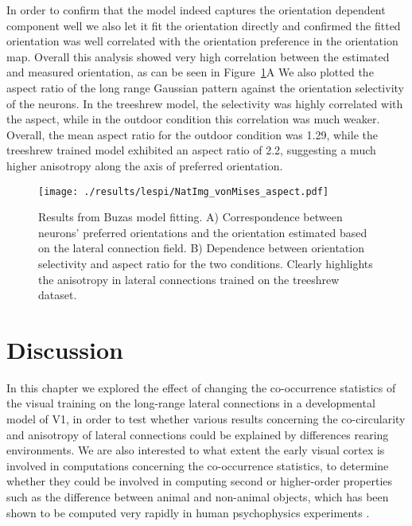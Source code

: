 In order to confirm that the model indeed captures the orientation
dependent component well we also let it fit the orientation directly
and confirmed the fitted orientation was well correlated with the
orientation preference in the orientation map. Overall this analysis
showed very high correlation between the estimated and measured
orientation, as can be seen in Figure~\ref{NatImgvonMisesAspect}A We
also plotted the aspect ratio of the long range Gaussian pattern
against the orientation selectivity of the neurons. In the treeshrew
model, the selectivity was highly correlated with the aspect, while in
the outdoor condition this correlation was much weaker. Overall, the
mean aspect ratio for the outdoor condition was 1.29, while the
treeshrew trained model exhibited an aspect ratio of 2.2, suggesting a
much higher anisotropy along the axis of preferred orientation.

\begin{figure}
	\centering
        \texttt{[image: ./results/lespi/NatImg\_vonMises\_aspect.pdf]}
	\caption[Results from Buzas model fitting.]{Results from Buzas
      model fitting. A) Correspondence between neurons' preferred
      orientations and the orientation estimated based on the lateral
      connection field. B) Dependence between orientation selectivity
      and aspect ratio for the two conditions. Clearly highlights the
      anisotropy in lateral connections trained on the treeshrew
      dataset.}
	\label{NatImgvonMisesAspect}
\end{figure}

\section{Discussion}

In this chapter we explored the effect of changing the co-occurrence
statistics of the visual training on the long-range lateral
connections in a developmental model of V1, in order to test whether
various results concerning the co-circularity \citep{Hunt2011} and
anisotropy of lateral connections \citep{Bosking1997} could be
explained by differences rearing environments. We are also interested
to what extent the early visual cortex is involved in computations
concerning the co-occurrence statistics, to determine whether they
could be involved in computing second or higher-order properties such
as the difference between animal and non-animal objects, which has
been shown to be computed very rapidly in human psychophysics
experiments \citep{Serre2007b}.

